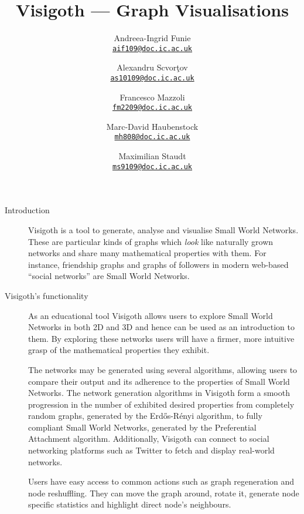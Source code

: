 \documentclass[a4paper,11pt]{article}
\let\stdhref\href
\renewcommand{\href}[2]{\stdhref{#1}{\texttt{#2}}}
\newcommand{\mailto}[1]{\href{mailto:#1}{#1}}
\begin{document}
\title{Visigoth --- Graph Visualisations}
\author{
  Andreea-Ingrid Funie\\\mailto{aif109@doc.ic.ac.uk}\and
  Alexandru Scvor\c tov\\\mailto{as10109@doc.ic.ac.uk}\and
  Francesco Mazzoli\\\mailto{fm2209@doc.ic.ac.uk}\and
  Marc-David Haubenstock\\\mailto{mh808@doc.ic.ac.uk}\and
  Maximilian Staudt\\\mailto{ms9109@doc.ic.ac.uk}
}
\date{}
\maketitle

\begin{description}
	\item[Introduction]

    Visigoth is a tool to generate, analyse and visualise Small World
    Networks. These are particular kinds of graphs which \emph{look} like
    naturally grown networks and share many mathematical properties with them.
    For instance, friendship graphs and graphs of followers in modern web-based
    ``social networks'' are Small World Networks.

	\item[Visigoth's functionality]

    As an educational tool Visigoth allows users to explore Small World Networks
    in both 2D and 3D and hence can be used as an introduction to them. By
    exploring these networks users will have a firmer, more intuitive grasp of
    the mathematical properties they exhibit.

    The networks may be generated using several algorithms, allowing users to
    compare their output and its adherence to the properties of Small World
    Networks. The network generation algorithms in Visigoth form a smooth
    progression in the number of exhibited desired properties from completely
    random graphs, generated by the Erd\H{o}s-R\'{e}nyi algorithm, to fully
    compliant Small World Networks, generated by the Preferential Attachment
    algorithm. Additionally, Visigoth can connect to social networking platforms
    such as Twitter to fetch and display real-world networks.

    Users have easy access to common actions such as graph regeneration and node
    reshuffling. They can move the graph around, rotate it, generate node
    specific statistics and highlight direct node's neighbours.


\end{description}
\end{document}
